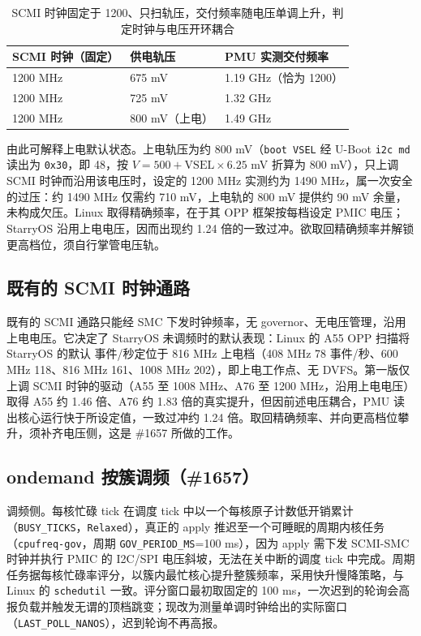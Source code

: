 \begin{table}[H]\centering\small
\begin{tabular}{@{}lll@{}}
\toprule
SCMI 时钟（固定） & 供电轨压 & PMU 实测交付频率 \\
\midrule
1200 MHz & 675 mV & 1.19 GHz（恰为 1200） \\
1200 MHz & 725 mV & 1.32 GHz \\
1200 MHz & 800 mV（上电） & 1.49 GHz \\
\bottomrule
\end{tabular}
\caption{SCMI 时钟固定于 1200、只扫轨压，交付频率随电压单调上升，判定时钟与电压开环耦合}
\end{table}

由此可解释上电默认状态。上电轨压为约 800 mV（\texttt{boot VSEL} 经 U-Boot \texttt{i2c md} 读出为 \texttt{0x30}，即 48，按 $V = 500 + \text{VSEL}\times 6.25$ mV 折算为 800 mV），只上调 SCMI 时钟而沿用该电压时，设定的 1200 MHz 实测约为 1490 MHz，属一次安全的过压：约 1490 MHz 仅需约 710 mV，上电轨的 800 mV 提供约 90 mV 余量，未构成欠压。Linux 取得精确频率，在于其 OPP 框架按每档设定 PMIC 电压；StarryOS 沿用上电电压，因而出现约 1.24 倍的一致过冲。欲取回精确频率并解锁更高档位，须自行掌管电压轨。

\subsection{既有的 SCMI 时钟通路}

既有的 SCMI 通路只能经 SMC 下发时钟频率，无 governor、无电压管理，沿用上电电压。它决定了 StarryOS 未调频时的默认表现：Linux 的 A55 OPP 扫描将 StarryOS 的默认 \nLadderBase{} 事件/秒定位于 816 MHz 上电档（408 MHz 78 事件/秒、600 MHz 118、816 MHz 161、1008 MHz 202），即上电工作点、无 DVFS。第一版仅上调 SCMI 时钟的驱动（A55 至 1008 MHz、A76 至 1200 MHz，沿用上电电压）取得 A55 约 1.46 倍、A76 约 1.83 倍的真实提升，但因前述电压耦合，PMU 读出核心运行快于所设定值，一致过冲约 1.24 倍。取回精确频率、并向更高档位攀升，须补齐电压侧，这是 \#1657 所做的工作。

\subsection{ondemand 按簇调频（\#1657）}

调频侧。每核忙碌 tick 在调度 tick 中以一个每核原子计数低开销累计（\texttt{BUSY\_TICKS}，\texttt{Relaxed}），真正的 apply 推迟至一个可睡眠的周期内核任务（\texttt{cpufreq-gov}，周期 \texttt{GOV\_PERIOD\_MS}=100 ms），因为 apply 需下发 SCMI-SMC 时钟并执行 PMIC 的 I2C/SPI 电压斜坡，无法在关中断的调度 tick 中完成。周期任务据每核忙碌率评分，以簇内最忙核心提升整簇频率，采用快升慢降策略，与 Linux 的 \texttt{schedutil} 一致。评分窗口最初取固定的 100 ms，一次迟到的轮询会高报负载并触发无谓的顶档跳变；现改为测量单调时钟给出的实际窗口（\texttt{LAST\_POLL\_NANOS}），迟到轮询不再高报。

